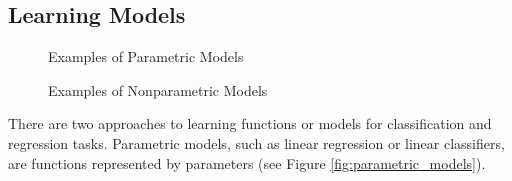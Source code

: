 \documentclass[twoside]{article}
\begin{document}
\subsection{Learning Models}

\begin{figure}[!ht]%
    \centering
    \qquad
    \caption{Examples of Parametric Models}%
    \label{fig:parametric_models}%
    \qquad
    \caption{Examples of Nonparametric Models}%
    \label{fig:nonparametric_models}%
\end{figure}

There are two approaches to learning functions or models for classification and regression tasks. Parametric models, such as linear regression or linear classifiers, are functions represented by parameters (see Figure \ref{fig:parametric_models}).
\end{document}
